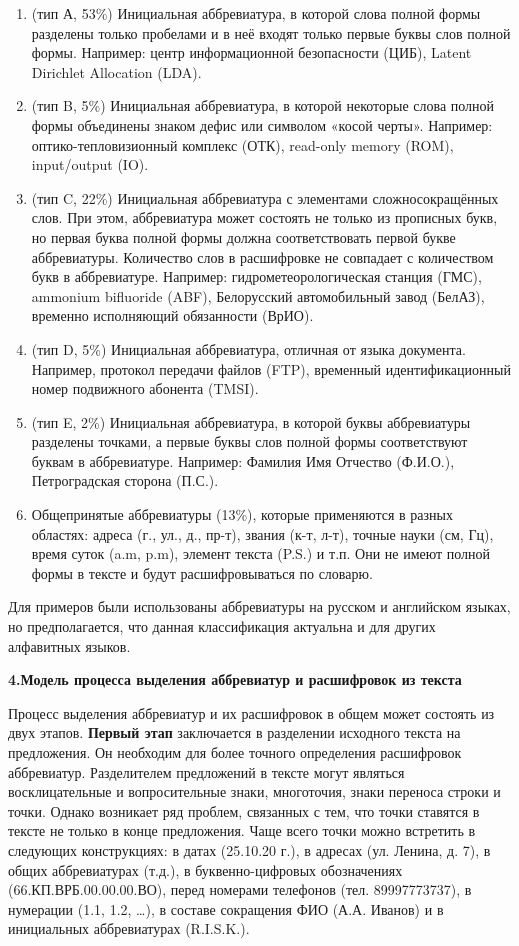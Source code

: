 \documentclass[fleqn, a4paper,12pt]{article}
\begin{document}
\begin{enumerate}[label=\arabic*., leftmargin=*, nosep, itemsep=2pt]
\item (тип А, 53\%) Инициальная аббревиатура, в которой слова полной формы разделены только пробелами и в неё входят только первые буквы слов полной формы. Например: центр информационной безопасности (ЦИБ), Latent Dirichlet Allocation (LDA).
\item (тип B, 5\%) Инициальная аббревиатура, в которой некоторые слова полной формы объединены знаком дефис или символом «косой черты». Например: оптико-тепловизионный комплекс (ОТК), read-only memory (ROM), input/output (IO).
\item (тип C, 22\%) Инициальная аббревиатура с элементами сложносокращённых слов. При этом, аббревиатура может состоять не только из прописных букв, но первая буква полной формы должна соответствовать первой букве аббревиатуры. Количество слов в расшифровке не совпадает с количеством букв в аббревиатуре. Например: гидрометеорологическая станция (ГМС), ammonium bifluoride (ABF), Белорусский автомобильный завод (БелАЗ), временно исполняющий обязанности (ВрИО).
\item (тип D, 5\%) Инициальная аббревиатура, отличная от языка документа. Например, протокол передачи файлов (FTP), временный идентификационный номер подвижного абонента (TMSI).
\item (тип E, 2\%) Инициальная аббревиатура, в которой буквы аббревиатуры разделены точками, а первые буквы слов полной формы соответствуют буквам в аббревиатуре. Например: Фамилия Имя Отчество (Ф.И.О.), Петроградская сторона (П.С.).
\item Общепринятые аббревиатуры (13\%), которые применяются в разных областях: адреса (г., ул., д., пр-т), звания (к-т, л-т), точные науки (см, Гц), время суток (a.m, p.m), элемент текста (P.S.) и т.п. Они не имеют полной формы в тексте и будут расшифровываться по словарю.
\end{enumerate}

Для примеров были использованы аббревиатуры на русском и английском языках, но предполагается, что данная классификация актуальна и для других алфавитных языков.

\vspace{0.5cm}

\textbf{4.Модель процесса выделения аббревиатур и расшифровок из текста}

Процесс выделения аббревиатур и их расшифровок в общем может состоять из двух этапов.
\textbf{Первый этап} заключается в разделении исходного текста на предложения. Он необходим для более точного определения расшифровок аббревиатур. Разделителем предложений в тексте могут являться восклицательные и вопросительные знаки, многоточия, знаки переноса строки и точки. Однако возникает ряд проблем, связанных с тем, что точки ставятся в тексте не только в конце предложения. Чаще всего точки можно встретить в следующих конструкциях: в датах (25.10.20 г.), в адресах (ул. Ленина, д. 7), в общих аббревиатурах (т.д.), в буквенно-цифровых обозначениях (66.КП.ВРБ.00.00.00.ВО), перед номерами телефонов (тел. 89997773737), в нумерации (1.1, 1.2, …), в составе сокращения ФИО (А.А. Иванов) и в инициальных аббревиатурах (R.I.S.K.). 
\end{document}
